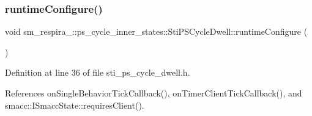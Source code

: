 \subsubsection{\texorpdfstring{runtime\+Configure()}{runtimeConfigure()}}
{\footnotesize\ttfamily void sm\+\_\+respira\+\_\+::ps\+\_\+cycle\+\_\+inner\+\_\+states\+::\+Sti\+P\+S\+Cycle\+Dwell\+::runtime\+Configure (\begin{DoxyParamCaption}{ }\end{DoxyParamCaption})\hspace{0.3cm}{\ttfamily [inline]}}



Definition at line 36 of file sti\+\_\+ps\+\_\+cycle\+\_\+dwell.\+h.



References on\+Single\+Behavior\+Tick\+Callback(), on\+Timer\+Client\+Tick\+Callback(), and smacc\+::\+I\+Smacc\+State\+::requires\+Client().


